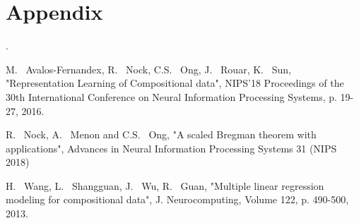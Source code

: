 \documentclass[BSc]{usydthesis}
\numberwithin{equation}{chapter}
\theoremstyle{remark}
\begin{document}
\chapter*{Appendix}
.

\begin{thebibliography}{10}


{\sc M.~ Avalos-Fernandex, R.~ Nock, C.S.~ Ong, J.~ Rouar, K.~ Sun}, "Representation Learning of Compositional data", NIPS'18 Proceedings of the 30th International Conference on Neural Information Processing Systems, p. 19-27, 2016. 

{\sc R.~ Nock, A.~ Menon and C.S.~ Ong}, "A scaled Bregman theorem with applications", Advances in Neural Information Processing Systems 31 (NIPS 2018)

{\sc H.~ Wang, L.~ Shangguan, J.~ Wu, R.~ Guan}, "Multiple linear regression modeling for compositional data", J. Neurocomputing, Volume 122, p. 490-500, 2013.






\end{thebibliography}
\end{document}
